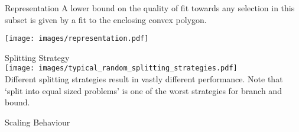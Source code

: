 \documentclass[landscape,final,a0paper,fontscale=0.27065]{baposter}
\begin{document}
\begin{poster}
\begin{posterbox}[name=representation,column=2,above=bottom,below=results]{Representation}
  A lower bound on the quality of fit towards any selection in this subset is
  given by a fit to the enclosing convex polygon.
  \vspace{1.0em}
  \begin{center}
    \texttt{[image: images/representation.pdf]}
  \end{center}
  \end{posterbox}
\begin{posterbox}[name=strategy,column=3,row=0]{Splitting Strategy}
  {\smaller{}\\[-0.5em]
    \texttt{[image: images/typical\_random\_splitting\_strategies.pdf]}}\\
    Different splitting strategies result in vastly different performance.
      Note that  `split into equal sized problems' is one of the worst strategies for
      branch and bound.
\end{posterbox}
\begin{posterbox}[name=scaling,column=3,below=strategy,above=source]{Scaling Behaviour}%
  \smaller%
  \\[0em]%
  \\[0em]%
  \\[0em]%
  \\[0em]%
\end{posterbox}

\end{poster}
\end{document}
